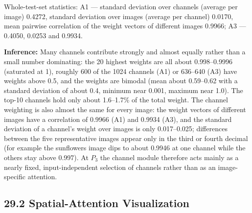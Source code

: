 \documentclass[10pt]{article}
\begin{document}
\begin{center}
\end{center}

Whole-test-set statistics: A1 --- standard deviation over channels (average per image) 0.4272, standard deviation over images (average per channel) 0.0170, mean pairwise correlation of the weight vectors of different images 0.9966; A3 --- 0.4050, 0.0253 and 0.9934.

\textbf{Inference:} Many channels contribute strongly and almost equally rather than a small number dominating: the 20 highest weights are all about 0.998--0.9996 (saturated at 1), roughly 600 of the 1024 channels (A1) or 636--640 (A3) have weights above 0.5, and the weights are bimodal (mean about 0.59--0.62 with a standard deviation of about 0.4,
minimum near 0.001, maximum near 1.0). The top-10 channels hold only about 1.6--1.7\% of the total weight. The channel weighting is also almost the same for every image: the weight vectors of different images have a correlation of 0.9966 (A1) and 0.9934 (A3), and the
standard deviation of a channel's weight over images is only 0.017--0.025; differences between the five representative images appear only in the third or fourth decimal (for example the sunflowers image dips to about 0.9946 at one channel while the others stay above 0.997). At $P_3$ the channel module therefore acts mainly as a nearly fixed, input-independent
selection of channels rather than as an image-specific attention.

\subsection*{29.2 Spatial-Attention Visualization}
\end{document}
